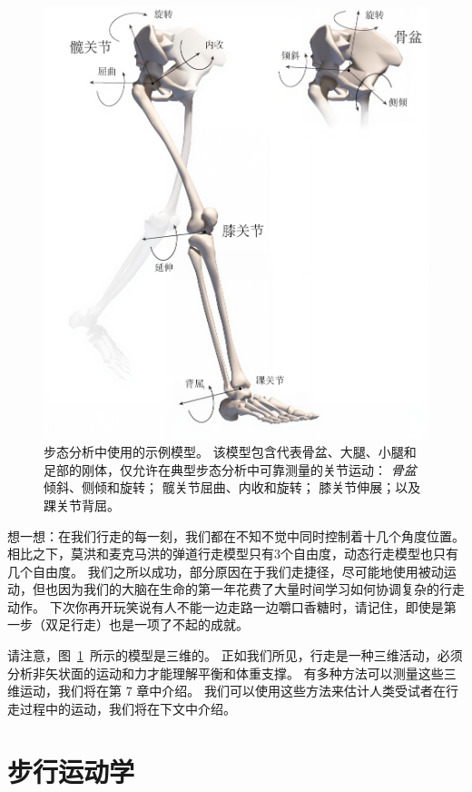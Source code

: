 \begin{figure}[!htb]
	\centering
	\includegraphics[width=1.0\linewidth]{chap2/2_17}
	\caption{步态分析中使用的示例模型。
		该模型包含代表骨盆、大腿、小腿和足部的刚体，仅允许在典型步态分析中可靠测量的关节运动：
		\textit{骨盆}倾斜、侧倾和旋转；
		髋关节屈曲、内收和旋转；
		膝关节伸展；以及踝关节背屈\cite{rajagopal2016full}。 \label{fig:2_17}}
\end{figure}


想一想：在我们行走的每一刻，我们都在不知不觉中同时控制着十几个角度位置。
相比之下，莫洪和麦克马洪的弹道行走模型只有3个自由度，动态行走模型也只有几个自由度。
我们之所以成功，部分原因在于我们走捷径，尽可能地使用被动运动，但也因为我们的大脑在生命的第一年花费了大量时间学习如何协调复杂的行走动作。
下次你再开玩笑说有人不能一边走路一边嚼口香糖时，请记住，即使是第一步（双足行走）也是一项了不起的成就。


请注意，图~\ref{fig:2_17}~所示的模型是三维的。
正如我们所见，行走是一种三维活动，必须分析非矢状面的运动和力才能理解平衡和体重支撑。
有多种方法可以测量这些三维运动，我们将在第 7 章中介绍。
我们可以使用这些方法来估计人类受试者在行走过程中的运动，我们将在下文中介绍。


\section{步行运动学}

